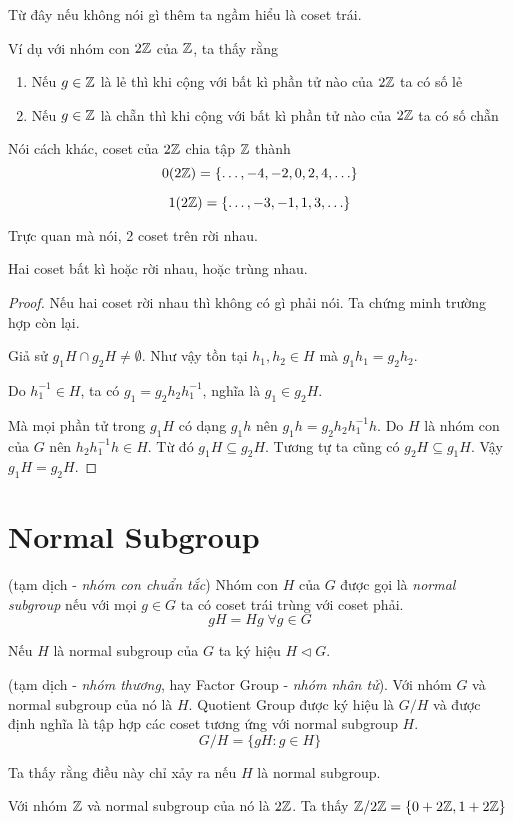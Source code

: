 Từ đây nếu không nói gì thêm ta ngầm hiểu là coset trái.

Ví dụ với nhóm con $2\mathbb{Z}$ của $\mathbb{Z}$, ta thấy rằng

\begin{enumerate}
    \item Nếu $g \in \mathbb{Z}$ là lẻ thì khi cộng với bất kì phần tử nào của $2\mathbb{Z}$ ta có số lẻ
    \item Nếu $g \in \mathbb{Z}$ là chẵn thì khi cộng với bất kì phần tử nào của $2\mathbb{Z}$ ta có số chẵn
\end{enumerate}

Nói cách khác, coset của $2\mathbb{Z}$ chia tập $\mathbb{Z}$ thành
\[0 (2\mathbb{Z}) = \{\ldots, -4, -2, 0, 2, 4, \ldots\}\]
 
\[1 (2\mathbb{Z}) = \{\ldots, -3, -1, 1, 3, \ldots \}\]

Trực quan mà nói, 2 coset trên rời nhau.

\begin{remark}
    Hai coset bất kì hoặc rời nhau, hoặc trùng nhau.
\end{remark}

\begin{proof}
    Nếu hai coset rời nhau thì không có gì phải nói. Ta chứng minh trường hợp còn lại.

    Giả sử $g_1 H \cap g_2 H \neq \emptyset$. Như vậy tồn tại $h_1, h_2 \in H$ mà $g_1 h_1 = g_2 h_2$.

    Do $h_1^{-1} \in H$, ta có $g_1 = g_2 h_2 h_1^{-1}$, nghĩa là $g_1 \in g_2 H$.

    Mà mọi phần tử trong $g_1 H$ có dạng $g_1 h$ nên $g_1 h = g_2 h_2 h_1^{-1} h$. Do $H$ là nhóm con của $G$ nên $h_2 h_1^{-1} h \in H$.
    Từ đó $g_1 H \subseteq g_2 H$. Tương tự ta cũng có $g_2 H \subseteq g_1 H$. Vậy $g_1 H = g_2 H$.
\end{proof}

\section{Normal Subgroup}

\begin{definition}
    (tạm dịch - \textit{nhóm con chuẩn tắc}) Nhóm con $H$ của $G$ được gọi là \textit{normal subgroup} nếu với mọi $g \in G$ ta có coset trái trùng với coset phải.
    \[gH = Hg \; \forall g \in G\]
\end{definition}

Nếu $H$ là normal subgroup của $G$ ta ký hiệu $H \triangleleft G$.

\begin{definition}
    (tạm dịch - \textit{nhóm thương}, hay Factor Group - \textit{nhóm nhân tử}). Với nhóm $G$ và normal subgroup của nó là $H$.
    Quotient Group được ký hiệu là $G / H$ và được định nghĩa là tập hợp các coset tương ứng với normal subgroup $H$.
    \[G / H = \{gH : g \in H \}\]

    Ta thấy rằng điều này chỉ xảy ra nếu $H$ là normal subgroup.
\end{definition}

\begin{example}
    Với nhóm $\mathbb{Z}$ và normal subgroup của nó là $2\mathbb{Z}$.
    Ta thấy $\mathbb{Z} / 2 \mathbb{Z} = \{0 + 2 \mathbb{Z}, 1 + 2 \mathbb{Z}\}$
\end{example}